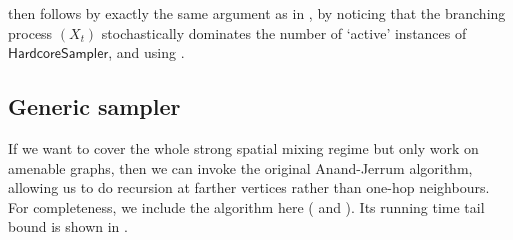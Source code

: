\documentclass{theoretics}
\renewcommand{\Pr}{\mathop{\mathrm{Pr}}\nolimits}
\newcommand{\hcsampler}{\mathsf{HardcoreSampler}}
\begin{document}
 then follows by exactly the same argument as in \cite[Proof of Lemma B.10]{FGWWY22}, by noticing that the branching process $(X_t)$ stochastically dominates the number of `active' instances of $\hcsampler$, and using . 


\subsection{Generic sampler}

If we want to cover the whole strong spatial mixing regime but only work on amenable graphs, then we can invoke the original Anand-Jerrum algorithm, allowing us to do recursion at farther vertices rather than one-hop neighbours. 
For completeness, we include the algorithm here ( and ). 
Its running time tail bound is shown in \cite[Lemma B.10]{FGWWY22}. 
\end{document}
